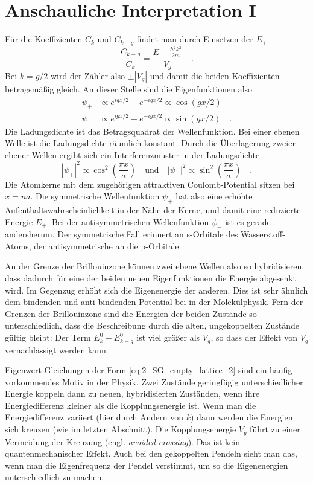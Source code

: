 \section*{Anschauliche Interpretation I}


Für die  Koeffizienten  $C_{k}$ und $C_{k - g}$ findet man durch Einsetzen der $E_\pm$
\begin{equation}
    \frac{ C_{k-g} }{ C_{k}} = \frac{E - \frac{\hbar^2 k^2}{2m}  }{V_g} \quad .
\end{equation}
Bei $k = g/2$ wird der Zähler also $\pm |V_g|$ und damit die beiden Koeffizienten betragsmäßig gleich.
An dieser Stelle sind die Eigenfunktionen  also
\begin{eqnarray}
    \psi_+ & \propto e^{i g x /2} +  e^{-i g x /2} \propto \cos (gx /2) \\
    \psi_- &\propto e^{i g x /2} -  e^{-i g x /2} \propto \sin (gx /2) \quad .
\end{eqnarray}
Die Ladungsdichte ist das Betragsquadrat der Wellenfunktion. Bei einer ebenen Welle ist die Ladungsdichte räumlich konstant. Durch die Überlagerung zweier ebener Wellen ergibt sich ein Interferenzmuster in der Ladungsdichte
\begin{equation}
    |\psi_+|^2 \propto \cos^2 \left( \frac{\pi x}{a}  \right) \quad \text{und} \quad  |\psi_-|^2 \propto \sin^2 \left( \frac{\pi x}{a}  \right)  \quad .
\end{equation}
Die Atomkerne mit dem zugehörigen attraktiven Coulomb-Potential sitzen bei $x = n a$. Die symmetrische Wellenfunktion $\psi_+$ hat also eine erhöhte Aufenthaltswahrscheinlichkeit in der Nähe der Kerne, und damit eine reduzierte Energie $E_+$. Bei der antisymmetrischen Wellenfunktion $\psi_-$ ist es gerade andersherum. Der symmetrische Fall erinnert an s-Orbitale des Wasserstoff-Atoms, der antisymmetrische an die p-Orbitale.

An der Grenze der Brillouinzone können zwei ebene Wellen also so hybridisieren, dass dadurch für eine der beiden neuen Eigenfunktionen die Energie abgesenkt wird. Im Gegenzug erhöht sich die Eigenenergie der anderen. Dies ist sehr ähnlich dem bindenden und anti-bindenden Potential bei  in der Molekülphysik. Fern der Grenzen der Brillouinzone sind die Energien der beiden Zustände so unterschiedlich, dass die Beschreibung durch die alten, ungekoppelten Zustände gültig bleibt: Der Term $ E_k^0 -   E_{k-g}^0$ ist viel größer als $V_g$, so dass der Effekt von $V_g$ vernachlässigt werden kann.

Eigenwert-Gleichungen der Form \ref{eq:2_SG_empty_lattice_2} sind ein häufig vorkommendes Motiv in der Physik. Zwei Zustände geringfügig unterschiedlicher Energie koppeln dann zu neuen, hybridisierten Zuständen, wenn ihre Energiedifferenz kleiner als die Kopplungsenergie ist. Wenn man die Energiedifferenz variiert (hier durch Ändern von $k$) dann werden die Energien sich kreuzen (wie im letzten Abschnitt). Die Kopplungsenergie $V_g$ führt zu einer Vermeidung der Kreuzung (engl. \emph{avoided crossing}). Das ist kein quantenmechanischer Effekt. Auch bei den gekoppelten Pendeln sieht man das, wenn man die Eigenfrequenz der Pendel verstimmt, um so die Eigenenergien unterschiedlich zu machen.


